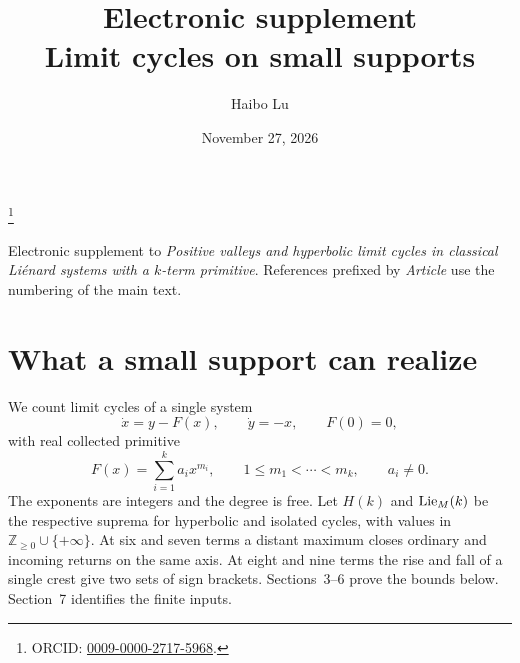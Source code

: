 
\title[Electronic supplement: limit cycles on small supports]{Electronic supplement\\ Limit cycles on small supports}
\author{Haibo Lu}
\address{Shanghai Institute of Technology}
\date{November 27, 2026}
\thanks{ORCID: \href{https://orcid.org/0009-0000-2717-5968}{0009-0000-2717-5968}.}


\maketitle
\noindent Electronic supplement to \emph{Positive valleys and hyperbolic limit
cycles in classical Li\'enard systems with a $k$-term primitive}. References prefixed
by \emph{Article} use the numbering of the main text.
\section{What a small support can realize}\label{sec:supp-intro}\hypertarget{public.audit}{}
We count limit cycles of a single system
\begin{equation}\label{eq:lienard}
  \dot{x}=y-F(x),\qquad \dot{y}=-x,\qquad F(0)=0,
\end{equation}
with real collected primitive
\begin{equation}\label{eq:collected}
  F(x)=\sum_{i=1}^k a_i x^{m_i},\qquad 1\le m_1<\cdots<m_k,\qquad a_i\ne0 .
\end{equation}
The exponents are integers and the degree is free. Let $H(k)$ and
$\operatorname{Lie}_{M}(k)$ be the respective suprema for hyperbolic and isolated cycles,
with values in $\mathbb Z_{\ge0}\cup\{+\infty\}$.
At six and seven terms a distant maximum closes ordinary and incoming
returns on the same axis. At eight and nine terms the rise and fall of
a single crest give two sets of sign brackets. Sections~3--6 prove the
bounds below. Section~7 identifies the finite inputs.

